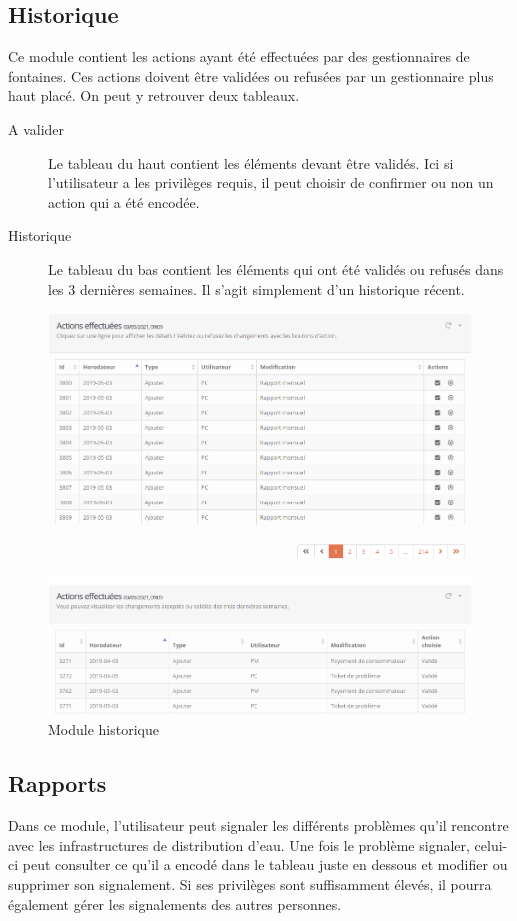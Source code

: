 \documentclass{EPL-master-thesis-covers-FR}
\begin{document}
			\subsection{Historique}
				Ce module contient les actions ayant été effectuées par des gestionnaires de fontaines. Ces actions doivent être validées ou refusées par un gestionnaire plus haut placé. On peut y retrouver deux tableaux.
				\begin{description}
					\item[A valider] Le tableau du haut contient les éléments devant être validés. Ici si l'utilisateur a les privilèges requis, il peut choisir de confirmer ou non un action qui a été encodée.
					\item[Historique] Le tableau du bas contient les éléments qui ont été validés ou refusés dans les 3 dernières semaines. Il s'agit simplement d'un historique récent.
				\end{description}
				\begin{figure}[H]
					\centering
					\includegraphics[width=1\textwidth]{images/logs}
					\caption{Module historique}
				\end{figure}
			
			\subsection{Rapports}
				Dans ce module, l'utilisateur peut signaler les différents problèmes qu'il rencontre avec les infrastructures de distribution d'eau. Une fois le problème signaler, celui-ci peut consulter ce qu'il a encodé dans le tableau juste en dessous et modifier ou supprimer son signalement. Si ses privilèges sont suffisamment élevés, il pourra également gérer les signalements des autres personnes.
				
\end{document}
